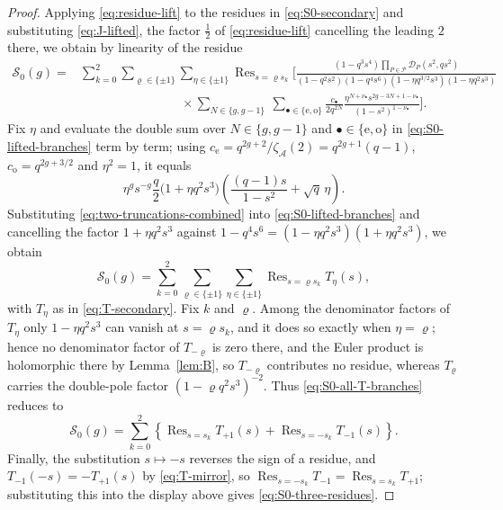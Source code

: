 \documentclass[a4paper,reqno]{amsart}
\numberwithin{equation}{section}
\theoremstyle{remark}
\theoremstyle{definition}
\newcommand{\A}{\mathcal{A}}
\newcommand{\zA}{\zeta_{\A}}
\begin{document}
\begin{proof}
Applying \eqref{eq:residue-lift} to the residues in \eqref{eq:S0-secondary}
and substituting \eqref{eq:J-lifted}, the
factor $\tfrac12$ of \eqref{eq:residue-lift} cancelling the leading $2$
there, we obtain by linearity of the residue
\begin{align}
\mathcal S_0(g)
={}&\sum_{k=0}^2\sum_{\varrho\in\{\pm1\}}\sum_{\eta\in\{\pm1\}}
\operatorname{Res}_{s=\varrho s_k}
\Biggl[\frac{(1-q^3s^4)\prod_{P\in\mathcal P}\mathcal D_P(s^2,qs^2)}
{(1-q^2s^2)(1-q^4s^6)(1-\eta q^{3/2}s^3)(1-\eta q^2s^3)}
\nonumber\\
&\hspace{8em}\times
\sum_{N\in\{g,g-1\}}\ \sum_{\bullet\in\{\mathrm e,\mathrm o\}}
\frac{c_\bullet}{2q^{2N}}
\frac{\eta^{N+\nu_\bullet}s^{2g-3N+1-\nu_\bullet}}
{(1-s^2)^{1-\nu_\bullet}}\Biggr].
\label{eq:S0-lifted-branches}
\end{align}
Fix $\eta$ and evaluate the double sum over $N\in\{g,g-1\}$ and
$\bullet\in\{\mathrm e,\mathrm o\}$ in \eqref{eq:S0-lifted-branches} term by
term; using $c_{\mathrm e}=q^{2g+2}/\zA(2)=q^{2g+1}(q-1)$,
$c_{\mathrm o}=q^{2g+3/2}$ and $\eta^2=1$, it equals
\begin{equation}\label{eq:two-truncations-combined}
\eta^gs^{-g}\frac{q}{2}\bigl(1+\eta q^2s^3\bigr)
\left(\frac{(q-1)s}{1-s^2}+\sqrt q\,\eta\right).
\end{equation}
Substituting \eqref{eq:two-truncations-combined} into
\eqref{eq:S0-lifted-branches} and cancelling the factor $1+\eta q^2s^3$
against $1-q^4s^6=(1-\eta q^2s^3)(1+\eta q^2s^3)$, we obtain
\begin{equation}\label{eq:S0-all-T-branches}
\mathcal S_0(g)=\sum_{k=0}^2\sum_{\varrho\in\{\pm1\}}\sum_{\eta\in\{\pm1\}}
\operatorname{Res}_{s=\varrho s_k}T_\eta(s),
\end{equation}
with $T_\eta$ as in \eqref{eq:T-secondary}.  Fix $k$ and $\varrho$.  Among
the denominator factors of $T_\eta$ only $1-\eta q^2s^3$ can vanish at
$s=\varrho s_k$, and it does so exactly when $\eta=\varrho$; hence no
denominator factor of $T_{-\varrho}$ is zero there, and the Euler product is
holomorphic there by Lemma~\ref{lem:B}, so $T_{-\varrho}$ contributes no
residue, whereas $T_\varrho$ carries the double-pole factor
$(1-\varrho q^2s^3)^{-2}$.  Thus
\eqref{eq:S0-all-T-branches} reduces to
$$
\mathcal S_0(g)
=
\sum_{k=0}^{2}
\left\{
\operatorname{Res}_{s=s_k}T_{+1}(s)
+
\operatorname{Res}_{s=-s_k}T_{-1}(s)
\right\}.
$$
Finally, the substitution $s\mapsto-s$ reverses the sign of a residue, and
$T_{-1}(-s)=-T_{+1}(s)$ by \eqref{eq:T-mirror}, so
$\operatorname{Res}_{s=-s_k}T_{-1}=\operatorname{Res}_{s=s_k}T_{+1}$;
substituting this into the display above gives
\eqref{eq:S0-three-residues}.
\end{proof}
\end{document}
